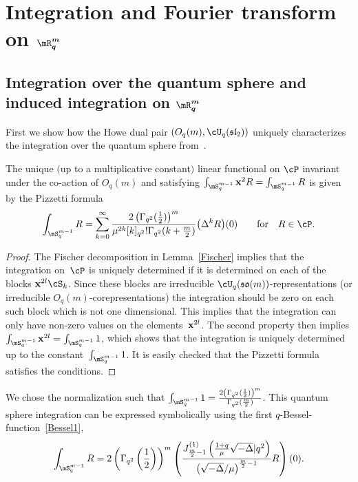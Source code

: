 \section[Integration and Fourier transform on $\mR^m_q$]{Integration and Fourier transform on $\boldsymbol{\mR^m_q}$}

\subsection[Integration over the quantum sphere and induced integration on $\mR^m_q$]{Integration over the quantum sphere and induced integration on $\boldsymbol{\mR^m_q}$}
\label{DefFourier}

First we show how the Howe dual pair $(O_q(m),\cU_q(\mathfrak{sl}_2))$ uniquely characterizes the integration over the quantum sphere from~\cite{MR1408120}.

\begin{theorem}
\label{Pizzth}
The unique $($up to a multiplicative constant$)$ linear functional on $\cP$ invariant under the co-action of $O_q(m)$ and satisfying $\int_{\mS^{m-1}_q}\bold{x}^2R=\int_{\mS^{m-1}_q}R$ is given by the Pizzetti formula
\begin{gather*}
\int_{\mS^{m-1}_q}R= \sum_{k=0}^\infty\frac{2\left(\Gamma_{q^2}(\frac{1}{2})\right)^{m}}{\mu^{2k}[k]_{q^2}!
\Gamma_{q^2}(k+\frac{m}{2})}\big(\Delta^kR\big)(0)\qquad\mbox{for}\quad R\in\cP.
\end{gather*}
\end{theorem}

\begin{proof}
The Fischer decomposition in Lemma~\ref{Fischer} implies that the integration on~$\cP$ is uniquely determined if it is determined on each of the blocks $\bold{x}^{2l}\cS_k$. Since these blocks are irreducible $\cU_q(\mathfrak{so}(m))$-representations (or irreducible $O_q(m)$-corepresentations) the integration should be zero on each such block which is not one dimensional. This implies that the integration can only have non-zero values on the elements~$\bold{x}^{2l}$. The second property then implies $\int_{\mS^{m-1}_q}\bold{x}^{2l}=\int_{\mS^{m-1}_q}1$, which shows that the integration is uniquely determined up to the constant~$\int_{\mS^{m-1}_q}1$. It is easily checked that the Pizzetti formula satisf\/ies the conditions.
\end{proof}

We chose the normalization such that $\int_{\mS^{m-1}_q}1
=\frac{2\left(\Gamma_{q^2}(\frac{1}{2})\right)^{m}}{\Gamma_{q^2}(\frac{m}{2})}$.
This quantum sphere integration can be expressed symbolically using the f\/irst $q$-Bessel-function~\eqref{Bessel1},
\begin{gather}
\label{PizzBessel}
\int_{\mS^{m-1}_q}R = 2\left(\Gamma_{q^2}\left(\frac{1}{2}\right)\right)^{m}\left(\frac{J^{(1)}_{\frac{m}{2}-1}
\left(\frac{1+q}{\mu}\sqrt{-\Delta}|q^2\right)}{\left(\sqrt{-\Delta}/\mu\right)^{\frac{m}{2}-1}}R\right)(0).
\end{gather}


